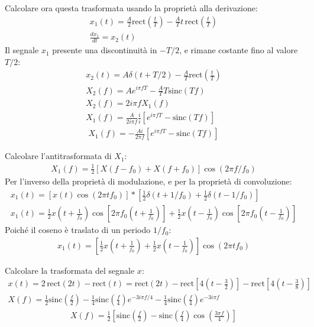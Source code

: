 \documentclass{article}
\begin{document}
Calcolare ora questa trasformata usando la proprietà alla derivazione:
\begin{gather*}
    x_1(t)=\displaystyle\frac{A}{2}\mbox{rect}\left(\frac{t}{T}\right)-\frac{A}{T}t\,\mbox{rect}\left(\frac{t}{T}\right)\\
    \displaystyle\frac{dx_1}{dt}=x_2(t)
\end{gather*}
Il segnale $x_1$ presente una discontinuità in $-T/2$, e rimane costante fino al valore $T/2$:
\begin{gather*}
    x_2(t)=A\delta(t+T/2)-\displaystyle\frac{A}{T}\mbox{rect}\left(\frac{t}{T}\right)\\
    X_2(f)=Ae^{i\pi fT}-\displaystyle\frac{A}{T}T\mbox{sinc}(Tf)\\
    X_2(f)=2i\pi fX_1(f)\\
    X_1(f)=\displaystyle\frac{A}{2i\pi f}\frac{i}{i}\left[e^{i\pi fT}-\mbox{sinc}(Tf)\right]
\end{gather*}
\begin{gather}
    X_1(f)=\displaystyle-\frac{Ai}{2\pi f}\left[e^{i\pi fT}-\mbox{sinc}(Tf)\right]
\end{gather}


Calcolare l'antitrasformata di $X_1$:
\begin{gather*}
    X_1(f)=\displaystyle\frac{1}{2}\left[X(f-f_0)+X(f+f_0)\right]\cos(2\pi f/f_0)
\end{gather*}
Per l'inverso della proprietà di modulazione, e per la proprietà di convoluzione:
\begin{gather*}
    x_1(t)=\left[x(t)\cos(2\pi tf_0)\right]*\left[\displaystyle\frac{1}{2}\delta(t+1/f_0)+\frac{1}{2}\delta(t-1/f_0)\right]\\
    x_1(t)=\displaystyle\frac{1}{2}x\left(t+\frac{1}{f_0}\right)\cos\left[2\pi f_0\left(t+\frac{1}{f_0}\right)\right]+\frac{1}{2}x\left(t-\frac{1}{f_0}\right)\cos\left[2\pi f_0\left(t-\frac{1}{f_0}\right)\right]
\end{gather*}
Poiché il coseno è traslato di un periodo $1/f_0$: 
\begin{gather}
    x_1(t)=\left[\displaystyle\frac{1}{2}x\left(t+\frac{1}{f_0}\right)+\frac{1}{2}x\left(t-\frac{1}{f_0}\right)\right]\cos(2\pi tf_0)
\end{gather}


Calcolare la trasformata del segnale $x$:
\begin{gather*}
    x(t)=2\,\mbox{rect}(2t)-\mbox{rect}(t)=\mbox{rect}(2t)-\mbox{rect}\left[\displaystyle4\left(t-\frac{3}{2}\right)\right]-\mbox{rect}\left[\displaystyle4\left(t-\frac{3}{8}\right)\right]\\
    X(f)=\displaystyle\frac{1}{2}\mbox{sinc}\left(\frac{f}{2}\right)-\frac{1}{4}\mbox{sinc}\left(\frac{f}{4}\right)e^{-3i\pi f/4}-\frac{1}{4}\mbox{sinc}\left(\frac{f}{4}\right)e^{-3i\pi f}
\end{gather*}
\begin{gather}
    X(f)=\displaystyle\frac{1}{2}\left[\mbox{sinc}\left(\frac{f}{2}\right)-\mbox{sinc}\left(\frac{f}{4}\right)\cos\left(\frac{3\pi f}{4}\right)\right]
\end{gather}
\end{document}
